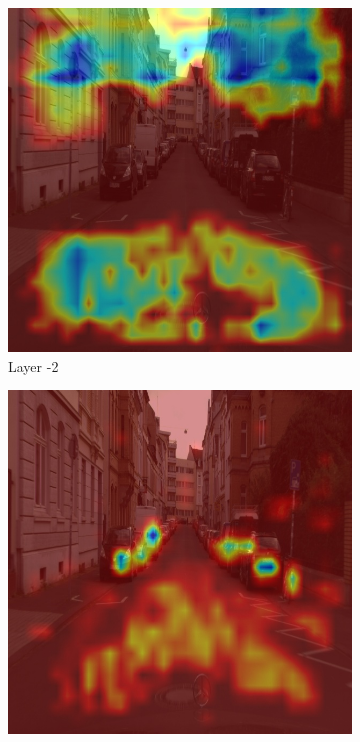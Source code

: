 \begin{figure}
    \centering


    \begin{subfigure}[b]{0.49\textwidth}
        \centering
        \includegraphics[width=\textwidth]{figures/bonn_000037_000019_leftImg8bit.pnglayer-2/bonn_000037_000019_leftImg8bit.png_object(0)_heatmap}
        \caption{Layer -2}
        \label{fig:c-2}
    \end{subfigure}
    \hfill
    \begin{subfigure}[b]{0.49\textwidth}
        \centering
        \includegraphics[width=\textwidth]{figures/bonn_000037_000019_leftImg8bit.pnglayer-3/bonn_000037_000019_leftImg8bit.png_object(0)_heatmap}

\end{subfigure}
\end{figure}
